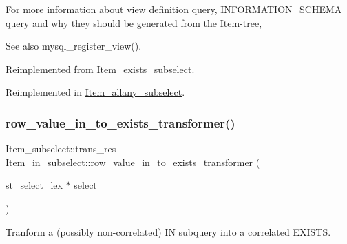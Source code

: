 For more information about view definition query, I\+N\+F\+O\+R\+M\+A\+T\+I\+O\+N\+\_\+\+S\+C\+H\+E\+MA query and why they should be generated from the \mbox{\hyperlink{classItem}{Item}}-\/tree, \begin{DoxySeeAlso}{See also}
mysql\+\_\+register\+\_\+view(). 
\end{DoxySeeAlso}


Reimplemented from \mbox{\hyperlink{classItem__exists__subselect_a795c650acea24859e6ff1d6f82d5a2ec}{Item\+\_\+exists\+\_\+subselect}}.



Reimplemented in \mbox{\hyperlink{classItem__allany__subselect_ade4b2eaa6af0cde005b082598d2e31b0}{Item\+\_\+allany\+\_\+subselect}}.

\mbox{\label{classItem__in__subselect_a6f5b5e6374b290d5efd086002d91ff92}} 
\subsubsection{\texorpdfstring{row\+\_\+value\+\_\+in\+\_\+to\+\_\+exists\+\_\+transformer()}{row\_value\_in\_to\_exists\_transformer()}}
{\footnotesize\ttfamily Item\+\_\+subselect\+::trans\+\_\+res Item\+\_\+in\+\_\+subselect\+::row\+\_\+value\+\_\+in\+\_\+to\+\_\+exists\+\_\+transformer (\begin{DoxyParamCaption}\item[{st\+\_\+select\+\_\+lex $\ast$}]{select }\end{DoxyParamCaption})}

Tranform a (possibly non-\/correlated) IN subquery into a correlated E\+X\+I\+S\+TS.

